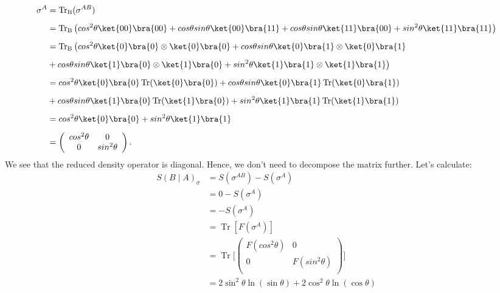 \begin{align}
\sigma^A &= \operatorname{Tr_B}(\sigma^{AB}) \nonumber \\[0.5em]
&= \operatorname{Tr_B} \big( cos^2 \theta \ket{00} \bra{00}+ cos \theta sin\theta \ket{00} \bra{11} + cos \theta sin\theta \ket{11} \bra{00} + sin^2 \theta \ket{11} \bra{11} \big) \nonumber \\[0.5em]
&= \operatorname{Tr_B}\big(cos^2 \theta \ket{0} \bra{0} \otimes \ket{0} \bra{0} + cos \theta sin\theta \ket{0} \bra{1} \otimes \ket{0} \bra{1} \nonumber \\[0.5em] &+ cos \theta sin\theta \ket{1} \bra{0} \otimes \ket{1} \bra{0} +sin^2 \theta \ket{1} \bra{1} \otimes \ket{1} \bra{1} 
\big) \nonumber \\[0.5em]
&=
cos^2 \theta \ket{0} \bra{0} \operatorname{Tr} (\ket{0} \bra{0}) + cos \theta sin \theta \ket{0} \bra{1} \operatorname{Tr}( \ket{0} \bra{1}) \nonumber \\[0.5em] &+ cos \theta sin\theta \ket{1} \bra{0} \operatorname{Tr}( \ket{1} \bra{0} ) +sin^2 \theta \ket{1} \bra{1} \operatorname{Tr}( \ket{1} \bra{1} )
\nonumber \\[0.5em]
&= cos^2 \theta \ket{0} \bra{0}
+sin^2 \theta \ket{1} \bra{1}
\nonumber \\[0.5em] &=
\left( \begin{array}{cccc}
 cos^2 \theta & 0  \\
 0 & sin^2 \theta  \\
\end{array}
\right).
\end{align}
We see that the reduced density operator is diagonal. Hence, we don't need to decompose the matrix further. Let's calculate:
\begin{align}
S(B \mid A)_{\sigma}&=S(\sigma^{AB})-S(\sigma^A)
\nonumber \\[0.5em] &=0-S(\sigma^A) \nonumber \\[0.5em]
&=-S(\sigma^A) \nonumber \\[0.5em]
&=\operatorname{Tr}[F(\sigma^{A})] \nonumber \\[0.5em]
&= \operatorname{Tr} \Big[
\left( \begin{array}{cccc}
 F(cos^2 \theta) & 0  \\
 0 & F(sin^2 \theta)  \\
\end{array}
\right)
\Big]
\nonumber \\[0.5em]
&= 
2 \sin ^2 \theta  \ln (\sin \theta )+2 \cos ^2 \theta  \ln (\cos \theta )
\end{align}
